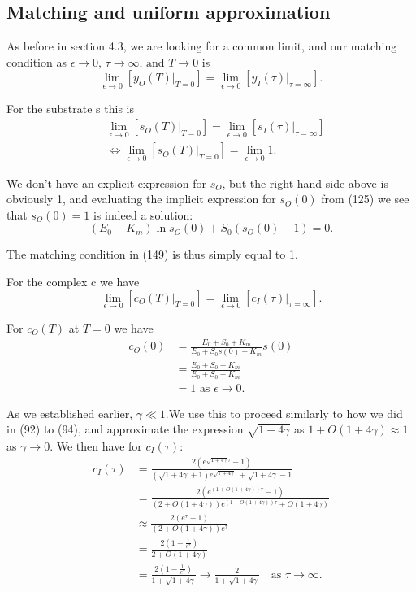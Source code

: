 \documentclass[12pt]{article}
\begin{document}
\subsection{Matching and uniform approximation}

As before in section 4.3, we are looking for a common limit, and our
matching condition as
$\epsilon \to 0 \text{, } \tau \to \infty \text{, and } T \to 0$ is
\begin{equation}
\lim_{\epsilon \to 0} [y_O(T) |_{T=0}] =
\lim_{\epsilon \to 0} [y_I(\tau) |_{\tau=\infty}].
\end{equation}

For the substrate s this is
\begin{align}
&\lim_{\epsilon \to 0} [s_O(T) |_{T=0}] =
  \lim_{\epsilon \to 0} [s_I(\tau) |_{\tau=\infty}] \\
&\iff \lim_{\epsilon \to 0} [s_O(T) |_{T=0}] =
  \lim_{\epsilon \to 0} 1.
\end{align}

We don't have an explicit expression for $s_O$, but the right hand
side above is obviously 1, and evaluating the implicit expression for
$s_O(0)$ from (125) we see that $s_O(0)=1$ is indeed a solution:
\begin{equation}
(E_0+K_m) \ln{s_O(0)} + S_0 (s_O(0) - 1) = 0.
\end{equation}

The matching condition in (149) is thus simply equal to 1.

For the complex c we have
\begin{equation}
\lim_{\epsilon \to 0} [c_O(T) |_{T=0}] =
  \lim_{\epsilon \to 0} [c_I(\tau) |_{\tau=\infty}].
\end{equation}

For $c_O(T)$ at $T=0$ we have
\begin{align}
c_O(0) &= \frac{E_0 + S_0 + K_m}{E_0+S_0 s(0) +K_m} s(0) \\
       &= \frac{E_0 + S_0 + K_m}{E_0+S_0  +K_m} \\
       &= 1 \text { as } \epsilon \to 0.
\end{align}

As we established earlier, $\gamma \ll 1$.We use this to proceed
similarly to how we did in (92) to (94), and approximate the
expression $\sqrt{1+4\gamma}$ as $1+O(1+4\gamma) \approx 1$ as
$\gamma \to 0$. We then have for $c_I(\tau)$:
\begin{align}
c_I(\tau) &=
     \frac{2(e^{\sqrt{1+4\gamma} \tau} - 1)}
   {(\sqrt{1+4\gamma} + 1) e^{\sqrt{1+4\gamma} \tau} + \sqrt{1+4\gamma} - 1} \\
&= \frac{2(e^{(1+O(1+4\gamma)) \tau} - 1)}
        {(2 + O(1+4\gamma)) e^{(1+O(1+4\gamma)) \tau} + O(1+4\gamma)} \\
&\approx \frac{2(e^{\tau} - 1)}
              {(2 + O(1+4\gamma)) e^{\tau}} \\
&= \frac{2(1 - \frac{1}{e^{\tau}})}
        {2 + O(1+4\gamma)} \\
&= \frac{2(1 - \frac{1}{e^{\tau}})}
        {1 + \sqrt{1+4\gamma}}
   \to \frac{2} {1 + \sqrt{1+4\gamma}} \quad \text{as } \tau \to \infty.
\end{align}
\end{document}
